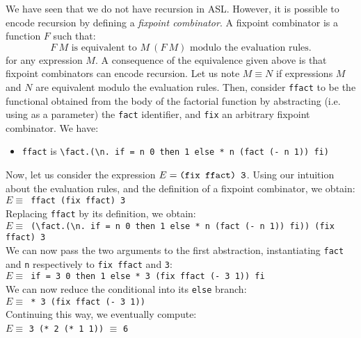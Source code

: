 We have seen that we do not have recursion in ASL. However, it is possible to
encode recursion by defining a {\em fixpoint combinator}.
A fixpoint combinator is a function $F$ such that:
\[
F~M \mbox{ is equivalent to } M~(F~M) \mbox{ modulo the evaluation rules.}
\]
for any expression $M$. A consequence of the equivalence given above
is that fixpoint combinators can encode recursion. Let us note $M
\equiv N$ if expressions $M$ and $N$ are equivalent modulo the
evaluation rules. Then, consider {\tt ffact} to be the functional
obtained from the body of the factorial function by abstracting (i.e.
using as a parameter) the {\tt fact} identifier, and {\tt fix} an
arbitrary fixpoint combinator. We have:
\begin{itemize}
\item[] \verb|ffact| is \verb|\fact.(\n. if = n 0 then 1 else * n (fact (- n 1)) fi)|
\end{itemize}
Now, let us consider the expression $E=\verb|(fix ffact) 3|$. Using our
intuition about the evaluation rules, and the definition of a fixpoint
combinator, we obtain:\\
\hspace{\parindent}\hspace{\parindent}
{\tt $E \equiv$ ffact (fix ffact) 3}\\
Replacing {\tt ffact} by its definition, we obtain:\\
\hspace{\parindent}\hspace{\parindent}
{\tt $E \equiv$  \verb|(\fact.(\n. if = n 0 then 1 else * n (fact (- n 1)) fi))| (fix ffact) 3}\\
We can now pass the two arguments to the first abstraction,
instantiating {\tt fact} and {\tt n} respectively to {\tt fix ffact}
and {\tt 3}:\\
\hspace{\parindent}\hspace{\parindent}
{\tt $E \equiv$  \verb|if = 3 0 then 1 else * 3 (fix ffact (- 3 1)) fi|}\\
We can now reduce the conditional into its {\tt else} branch:\\
\hspace{\parindent}\hspace{\parindent}
{\tt $E \equiv$  \verb|* 3 (fix ffact (- 3 1))|}\\
Continuing this way, we eventually compute:\\
\hspace{\parindent}\hspace{\parindent}
$E\equiv$ {\tt * 3 (* 2 (* 1 1))} $\equiv$ {\tt 6}

